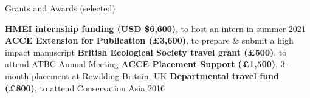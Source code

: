 \begin{rubric}{Grants and Awards (selected)}

\entry*[2021] \textbf{HMEI internship funding (USD \$6,600)}, to host an intern in summer 2021
\entry*[2018] \textbf{ACCE Extension for Publication (£3,600)}, to prepare \& submit a high impact manuscript
\entry*[2018] \textbf{British Ecological Society travel grant (£500)}, to attend ATBC Annual Meeting
\entry*[2016] \textbf{ACCE Placement Support (£1,500)}, 3-month placement at Rewilding Britain, UK
\entry*[2016] \textbf{Departmental travel fund (£800)}, to attend Conservation Asia 2016
\end{rubric}
